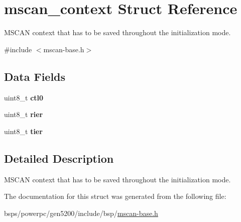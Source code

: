 \hypertarget{structmscan__context}{}\section{mscan\+\_\+context Struct Reference}
\label{structmscan__context}


M\+S\+C\+AN context that has to be saved throughout the initialization mode.  




{\ttfamily \#include $<$mscan-\/base.\+h$>$}

\subsection*{Data Fields}
\begin{DoxyCompactItemize}
\item 
\mbox{\label{structmscan__context_af404d8ce54287cd3689aac1964804364}} 
uint8\+\_\+t {\bfseries ctl0}
\item 
\mbox{\label{structmscan__context_aff065fd0abc9556b04b9ce791198d043}} 
uint8\+\_\+t {\bfseries rier}
\item 
\mbox{\label{structmscan__context_a515f66919dbfa98fe8af26aa8235448e}} 
uint8\+\_\+t {\bfseries tier}
\end{DoxyCompactItemize}


\subsection{Detailed Description}
M\+S\+C\+AN context that has to be saved throughout the initialization mode. 

The documentation for this struct was generated from the following file\+:\begin{DoxyCompactItemize}
\item 
bsps/powerpc/gen5200/include/bsp/\mbox{\hyperlink{mscan-base_8h}{mscan-\/base.\+h}}\end{DoxyCompactItemize}
